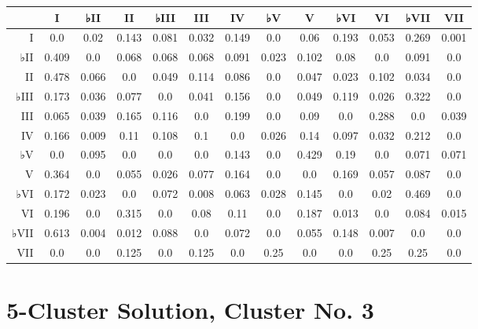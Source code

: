 \begin{table}[htbp]
\begin{minipage}{\linewidth}
\setlength{\tymax}{0.5\linewidth}
\centering
\small
\begin{tabulary}{\textwidth}{@{}RCCCCCCCCCCCC@{}} \toprule
&I&♭II&II&♭III&III&IV&♭V&V&♭VI&VI&♭VII&VII\\
\midrule
I&0.0&0.02&0.143&0.081&0.032&0.149&0.0&0.06&0.193&0.053&0.269&0.001\\
♭II&0.409&0.0&0.068&0.068&0.068&0.091&0.023&0.102&0.08&0.0&0.091&0.0\\
II&0.478&0.066&0.0&0.049&0.114&0.086&0.0&0.047&0.023&0.102&0.034&0.0\\
♭III&0.173&0.036&0.077&0.0&0.041&0.156&0.0&0.049&0.119&0.026&0.322&0.0\\
III&0.065&0.039&0.165&0.116&0.0&0.199&0.0&0.09&0.0&0.288&0.0&0.039\\
IV&0.166&0.009&0.11&0.108&0.1&0.0&0.026&0.14&0.097&0.032&0.212&0.0\\
♭V&0.0&0.095&0.0&0.0&0.0&0.143&0.0&0.429&0.19&0.0&0.071&0.071\\
V&0.364&0.0&0.055&0.026&0.077&0.164&0.0&0.0&0.169&0.057&0.087&0.0\\
♭VI&0.172&0.023&0.0&0.072&0.008&0.063&0.028&0.145&0.0&0.02&0.469&0.0\\
VI&0.196&0.0&0.315&0.0&0.08&0.11&0.0&0.187&0.013&0.0&0.084&0.015\\
♭VII&0.613&0.004&0.012&0.088&0.0&0.072&0.0&0.055&0.148&0.007&0.0&0.0\\
VII&0.0&0.0&0.125&0.0&0.125&0.0&0.25&0.0&0.0&0.25&0.25&0.0\\

\bottomrule

\end{tabulary}
\end{minipage}
\end{table}

\section{5-Cluster Solution, Cluster No. 3}
\label{5-clustersolutionclusterno.3}

